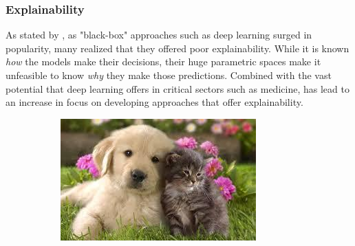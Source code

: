 \subsubsection{Explainability}
As stated by \textcite{XAI}, as "black-box" approaches such as deep learning surged in popularity, many realized that they offered poor explainability. While it is known \textit{how} the models make their decisions, their huge parametric spaces make it unfeasible to know \textit{why} they make those predictions. Combined with the vast potential that deep learning offers in critical sectors such as medicine, has lead to an increase in focus on developing approaches that offer explainability.
\begin{figure}[htb]
    \centering
    \begin{subfigure}{0.2\linewidth}
        \includegraphics[width=\linewidth, height=\linewidth]{resources/related_works/gradcam_original.jpg}
    \end{subfigure}
    \begin{subfigure}{0.2\linewidth}

\end{subfigure}
\end{figure}
